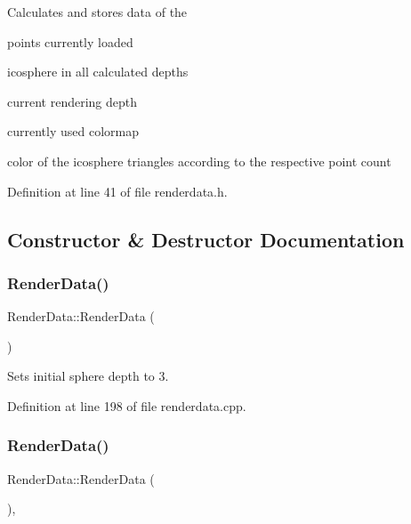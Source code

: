 Calculates and stores data of the
\begin{DoxyItemize}
\item points currently loaded
\item icosphere in all calculated depths
\item current rendering depth
\item currently used colormap
\item color of the icosphere triangles according to the respective point count 
\end{DoxyItemize}

Definition at line 41 of file renderdata.\+h.



\subsection{Constructor \& Destructor Documentation}
\mbox{\label{class_render_data_a16b04b2437ea3fa034381a138cbf2f83}} 
\subsubsection{\texorpdfstring{Render\+Data()}{RenderData()}\hspace{0.1cm}{\footnotesize\ttfamily [1/2]}}
{\footnotesize\ttfamily Render\+Data\+::\+Render\+Data (\begin{DoxyParamCaption}{ }\end{DoxyParamCaption})\hspace{0.3cm}{\ttfamily [private]}}



Sets initial sphere depth to 3. 



Definition at line 198 of file renderdata.\+cpp.

\mbox{\label{class_render_data_ab5f9324f666abc4b85fd2c6ed868c6be}} 
\subsubsection{\texorpdfstring{Render\+Data()}{RenderData()}\hspace{0.1cm}{\footnotesize\ttfamily [2/2]}}
{\footnotesize\ttfamily Render\+Data\+::\+Render\+Data (\begin{DoxyParamCaption}\item[{const \hyperlink{class_render_data}{Render\+Data} \&}]{ }\end{DoxyParamCaption})\hspace{0.3cm}{\ttfamily [private]}, {\ttfamily [delete]}}



